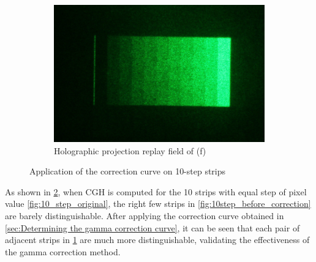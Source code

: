 \begin{figure}[H]
\begin{subfigure}[t]{0.37\textwidth}
    \includegraphics[width=\textwidth]{10step_after_correction.png}
    \caption{Holographic projection replay field of (f)}\label{fig:10step_after_correction}
  \end{subfigure}

  \caption{Application of the correction curve on 10-step strips}
  \label{fig:Application of the correction curve on 10-step strips}
\end{figure}

As shown in \cref{fig:Application of the correction curve on 10-step strips}, when CGH is computed for the 10 strips with equal step of pixel value \cref{fig:10_step_original}, the right few strips in \cref{fig:10step_before_correction} are barely distinguishable. After applying the correction curve obtained in \cref{sec:Determining the gamma correction curve}, it can be seen that each pair of adjacent strips in \cref{fig:10step_after_correction} are much more distinguishable, validating the effectiveness of the gamma correction method.



